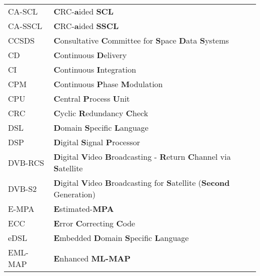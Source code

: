 \begin{center}
\begin{longtable}{ p{}  p{} }
		CA-SCL  & \textbf{C}RC-\textbf{a}ided \textbf{SCL}                                                                        \\
		CA-SSCL & \textbf{C}RC-\textbf{a}ided \textbf{SSCL}                                                                       \\
		CCSDS   & \textbf{C}onsultative \textbf{C}ommittee for \textbf{S}pace \textbf{D}ata \textbf{S}ystems                      \\
		CD      & \textbf{C}ontinuous \textbf{D}elivery                                                                           \\
		CI      & \textbf{C}ontinuous \textbf{I}ntegration                                                                        \\
		CPM     & \textbf{C}ontinuous \textbf{P}hase \textbf{M}odulation                                                          \\
		CPU     & \textbf{C}entral \textbf{P}rocess \textbf{U}nit                                                                 \\
		CRC     & \textbf{C}yclic \textbf{R}edundancy \textbf{C}heck                                                              \\
		DSL     & \textbf{D}omain \textbf{S}pecific \textbf{L}anguage                                                             \\
		DSP     & \textbf{D}igital \textbf{S}ignal \textbf{P}rocessor                                                             \\
		DVB-RCS & \textbf{D}igital \textbf{V}ideo \textbf{B}roadcasting - \textbf{R}eturn \textbf{C}hannel via \textbf{S}atellite \\
		DVB-S2  & \textbf{D}igital \textbf{V}ideo \textbf{B}roadcasting for \textbf{S}atellite (\textbf{Second} Generation)       \\
		E-MPA   & \textbf{E}stimated-\textbf{MPA}                                                                                 \\
		ECC     & \textbf{E}rror \textbf{C}orrecting \textbf{C}ode                                                                \\
		eDSL    & \textbf{E}mbedded \textbf{D}omain \textbf{S}pecific \textbf{L}anguage                                           \\
		EML-MAP & \textbf{E}nhanced \textbf{ML-MAP}                                                                               \\

\end{longtable}
\end{center}
